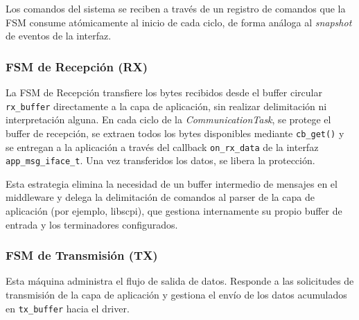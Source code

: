 Los comandos del sistema se reciben a través de un registro de comandos que la FSM consume atómicamente al inicio de cada ciclo, de forma análoga al \textit{snapshot} de eventos de la interfaz.

\subsubsection{FSM de Recepción (RX)}
\label{subsubsec:fsm-rx}

La FSM de Recepción transfiere los bytes recibidos desde el buffer circular \texttt{rx\_buffer} directamente a la capa de aplicación, sin realizar delimitación ni interpretación alguna. En cada ciclo de la \textit{CommunicationTask}, se protege el buffer de recepción, se extraen todos los bytes disponibles mediante \texttt{cb\_get()} y se entregan a la aplicación a través del callback \texttt{on\_rx\_data} de la interfaz \texttt{app\_msg\_iface\_t}. Una vez transferidos los datos, se libera la protección.

Esta estrategia elimina la necesidad de un buffer intermedio de mensajes en el middleware y delega la delimitación de comandos al parser de la capa de aplicación (por ejemplo, libscpi), que gestiona internamente su propio buffer de entrada y los terminadores configurados.

\subsubsection{FSM de Transmisión (TX)}
\label{subsubsec:fsm-tx}

Esta máquina administra el flujo de salida de datos. Responde a las solicitudes de transmisión de la capa de aplicación y gestiona el envío de los datos acumulados en \texttt{tx\_buffer} hacia el driver.


